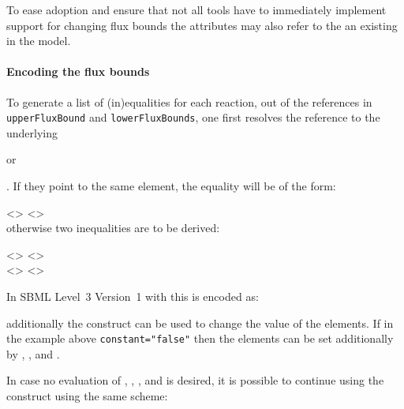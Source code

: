 \begin{newsection}
\begin{deprecated}
{
To ease adoption and ensure that not all tools have to immediately implement 
support for changing flux bounds the attributes may also refer to the an existing
\FluxBound in the model. 
}
\end{deprecated}

\paragraph{Encoding the flux bounds}
To generate a list of (in)equalities for each reaction, out of the references 
in \texttt{upperFluxBound} and \texttt{lowerFluxBounds}, one first resolves the 
reference to the underlying \Parameter 
\begin{deprecated}
or \FluxBound
\end{deprecated}. If they point to the same element, the equality will be of the form: 

<> \token{=} <>\\

otherwise two inequalities are to be derived:

<> \token{>=} <>\\
<> \token{<=} <>

In SBML Level~3 Version~1 with \FBC this is encoded as:
%

additionally the \InitialAssignment construct can be used to change the value of the 
\Parameter elements. If in the example above \texttt{constant="false"} then the elements
can be set additionally by  \EventAssignment, \AssignmentRule, and \AlgebraicRule.


\begin{deprecated}

In case no evaluation of \InitialAssignment, \EventAssignment, \AssignmentRule, 
and \AlgebraicRule is desired, it is possible to continue using the \FluxBound 
construct using the same scheme: 


\end{deprecated}

%


%

%


\end{newsection}
